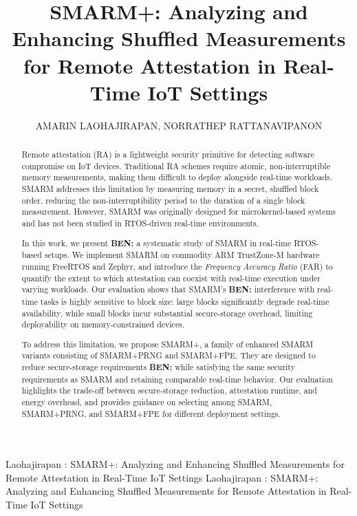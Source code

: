 \documentclass{ieeeaccess}
\DeclareRobustCommand{\ben}[1]{{\color{BENcolor}\textbf{BEN:} #1}}
\begin{document}

\title{SMARM+: Analyzing and Enhancing Shuffled Measurements for Remote Attestation in Real-Time IoT Settings}\author{\uppercase{Amarin Laohajirapan},
\uppercase{Norrathep Rattanavipanon}}

\address[1]{College of Computing, Prince of Songkla University, Phuket Campus, Phuket, Thailand (e-mail: 6730621007@psu.ac.th)}

\address[2]{College of Computing, Prince of Songkla University, Phuket Campus, Phuket, Thailand (e-mail: norrathep.r@psu.ac.th)}

\markboth
{Laohajirapan \headeretal: SMARM+: Analyzing and Enhancing Shuffled Measurements for Remote Attestation in Real-Time IoT Settings}
{Laohajirapan \headeretal: SMARM+: Analyzing and Enhancing Shuffled Measurements for Remote Attestation in Real-Time IoT Settings}



\begin{abstract}
Remote attestation (RA) is a lightweight security primitive for detecting software compromise on IoT devices. Traditional RA schemes require atomic, non-interruptible memory measurements, making them difficult to deploy alongside real-time workloads. SMARM addresses this limitation by measuring memory in a secret, shuffled block order, reducing the non-interruptibility period to the duration of a single block measurement. However, SMARM was originally designed for microkernel-based systems and has not been studied in RTOS-driven real-time environments.



In this work, we present \ben{a systematic study} of SMARM in real-time RTOS-based setups. We implement SMARM on commodity ARM TrustZone-M hardware running FreeRTOS and Zephyr, and introduce the \emph{Frequency Accuracy Ratio} (FAR) to quantify the extent to which attestation can coexist with real-time execution under varying workloads. Our evaluation shows that SMARM’s \ben{interference with real-time tasks} is highly sensitive to block size: large blocks significantly degrade real-time availability, while small blocks incur substantial secure-storage overhead, limiting deployability on memory-constrained devices.

To address this limitation, we propose SMARM+, a family of enhanced SMARM variants consisting of SMARM+PRNG and SMARM+FPE. They are designed to reduce secure-storage requirements \ben{while satisfying the same security requirements as SMARM and retaining comparable real-time behavior}. Our evaluation highlights the trade-off between secure-storage reduction, attestation runtime, and energy overhead, and provides guidance on selecting among SMARM, SMARM+PRNG, and SMARM+FPE for different deployment settings.

\end{abstract}
\end{document}
